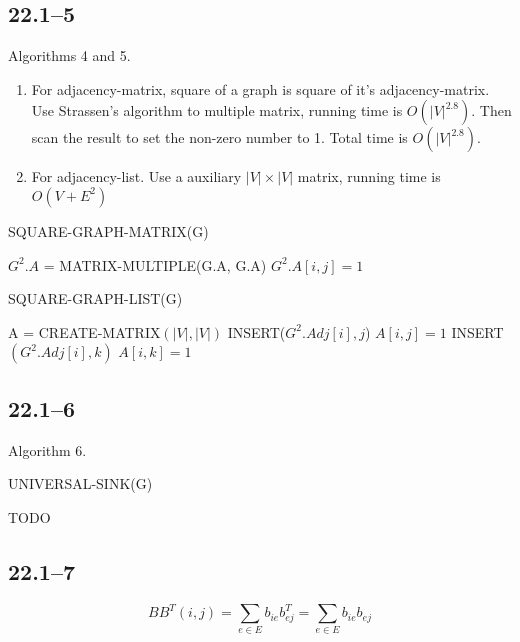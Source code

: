 \documentclass{article}
\begin{document}
\subsection*{22.1--5}
Algorithms 4 and 5.
\begin{enumerate}
\item For adjacency-matrix, square of a graph is square of it's adjacency-matrix. Use Strassen's algorithm to multiple matrix, running time is $O(|V|^{2.8})$. Then scan the result to set the non-zero number to 1. Total time is
$O(|V|^{2.8})$.
\item For adjacency-list. Use a auxiliary $|V|\times|V|$ matrix, running time
is $O(V+E^2)$
\end{enumerate}

\begin{algorithm}
  \caption{SQUARE-GRAPH-MATRIX(G)}
  \begin{algorithmic}[1]
    \STATE $G^2.A$ = MATRIX-MULTIPLE(G.A, G.A) 
    \STATE $G^2.A[i, j] = 1$
    \ENDIF
    \ENDFOR
    \ENDFOR
  \end{algorithmic}
\end{algorithm}

\begin{algorithm}
  \caption{SQUARE-GRAPH-LIST(G)}
  \begin{algorithmic}[1]
    \STATE A = CREATE-MATRIX$(|V|, |V|)$
    \STATE INSERT($G^2.Adj[i], j$)
    \STATE $A[i, j] = 1$
    \ENDIF
    \STATE INSERT$(G^2.Adj[i], k)$
    \STATE $A[i, k] = 1$
    \ENDIF
    \ENDFOR
    \ENDFOR
    \ENDFOR
  \end{algorithmic}
\end{algorithm}

\subsection*{22.1--6}
Algorithm 6.\\
\begin{algorithm}
  \caption{UNIVERSAL-SINK(G)}
  \begin{algorithmic}[1]
    \STATE TODO
  \end{algorithmic}
\end{algorithm}

\subsection*{22.1--7}
\begin{displaymath}
  BB^T(i, j) = \sum_{e\in{E}}b_{ie}b_{ej}^T = \sum_{e\in{E}}b_{ie}b_{ej}
\end{displaymath}
\end{document}
